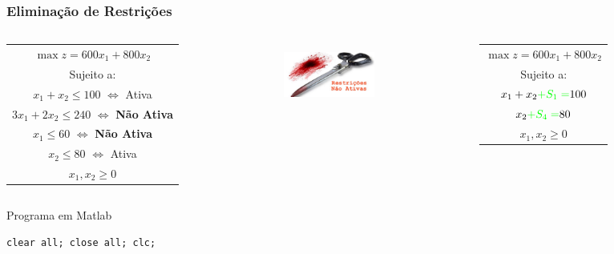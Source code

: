 \documentclass{beamer}
\begin{document}
\begin{frame}[fragile]
	\frametitle{Eliminação de Restrições}
	\begin{columns}
		\begin{column}{5cm}
			\scriptsize
			\begin{table}
				\begin{tabular}{c}
					\cellcolor{red!50} $ \max z = 600x_1 + 800x_2 $ \\
					\cellcolor{red!50} Sujeito a: \\
					\cellcolor{red!50} $x_1 + x_2 \le 100$ {\color{green} $\Leftrightarrow$ Ativa}\\
					\cellcolor{red!50} $3x_1 + 2x_2 \le 240$ {\color{green} $\Leftrightarrow$ \textbf{Não Ativa}}\\
					\cellcolor{red!50} $x_1 \le 60 $ {\color{green} $\Leftrightarrow$ \textbf{Não Ativa}}\\
					\cellcolor{red!50} $x_2 \le 80 $ {\color{green} $\Leftrightarrow$ Ativa}\\
				    \cellcolor{red!50} $x_1, x_2 \ge 0 $ \\
				\end{tabular}
			\end{table}
		\end{column} \pause
		\begin{column}{3cm}
			\centering
			\includegraphics[width=3cm,height=2cm]{tesoura.jpg} \\
		\end{column}
		\begin{column}{4cm}
			\scriptsize
			\begin{table}
				\begin{tabular}{c}
					\cellcolor{red!50} $ \max z = 600x_1 + 800x_2 $ \\
					\cellcolor{red!50} Sujeito a: \\
					\cellcolor{red!50} $x_1 + x_2 {\color{green}+ S_1 =}  100$ \\
					\cellcolor{red!50} $x_2 {\color{green}+ S_4 =}  80 $ \\
				    \cellcolor{red!50} $x_1, x_2 \ge 0 $ \\
				\end{tabular}
			\end{table}
		\end{column} \pause
	\end{columns}
	\begin{columns}
		\begin{column}{6cm}		
			\centering
			\begin{block}{Programa em Matlab}
				\begin{lstlisting}[basicstyle=\tiny]  
clear all; close all; clc;


\end{lstlisting}
\end{block}
\end{column}
\end{columns}
\end{frame}
\end{document}
